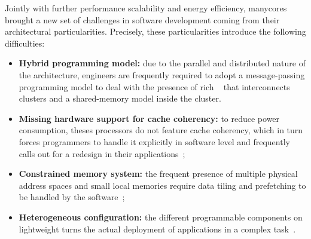     Jointly with further performance scalability and energy efficiency, manycores brought a new set of challenges in software development coming from their architectural particularities.
    Precisely, these particularities introduce the following difficulties:
    \begin{itemize}
        \item \textbf{Hybrid programming model:} due to the parallel and distributed nature of the architecture, engineers are frequently required to adopt a message-passing programming model to deal with the presence of rich \nocs~\cite{kelly2013} that interconnects clusters and a shared-memory model inside the cluster.
        \item \textbf{Missing hardware support for cache coherency:} to reduce power consumption, theses processors do not feature cache coherency, which in turn forces programmers to handle it explicitly in software level and frequently calls out for a redesign in their applications~\cite{francesquini2015};
        \item \textbf{Constrained memory system:} the frequent presence of multiple physical address spaces and small local memories require data tiling and prefetching to be handled by the software~\cite{Castro2016};
        \item \textbf{Heterogeneous configuration:} the different programmable components on lightweight \manycores turns the actual deployment of applications in a complex task~\cite{barbalace2015}.
    \end{itemize}



